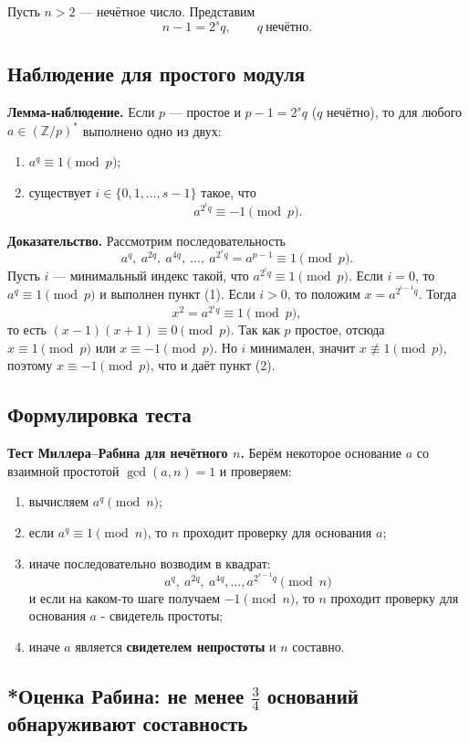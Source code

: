 \documentclass[12pt,a4paper]{article}
\newcommand{\Z}{\mathbb{Z}}
\DeclareMathOperator{\gcdop}{gcd}
\begin{document}
Пусть $n>2$ — нечётное число. Представим
\[
n-1=2^{s}q,\qquad q\ \text{нечётно}.
\]

\subsection*{Наблюдение для простого модуля}

\textbf{Лемма-наблюдение.}
Если $p$ — простое и $p-1=2^s q$ ($q$ нечётно), то для любого $a\in(\Z/p)^{\ast}$ выполнено одно из двух:
\begin{enumerate}
  \item $a^q\equiv 1\pmod p$;
  \item существует $i\in\{0,1,\dots,s-1\}$ такое, что
  \[
  a^{2^{i}q}\equiv -1\pmod p.
  \]
\end{enumerate}

\textbf{Доказательство.}
Рассмотрим последовательность
\[
a^{q},\ a^{2q},\ a^{4q},\ \dots,\ a^{2^{s}q}=a^{p-1}\equiv 1\pmod p.
\]
Пусть $i$ — минимальный индекс такой, что $a^{2^{i}q}\equiv 1\pmod p$.
Если $i=0$, то $a^{q}\equiv 1\pmod p$ и выполнен пункт (1).
Если $i>0$, то положим $x=a^{2^{i-1}q}$. Тогда
\[
x^2=a^{2^{i}q}\equiv 1\pmod p,
\]
то есть $(x-1)(x+1)\equiv 0\pmod p$.
Так как $p$ простое, отсюда $x\equiv 1\pmod p$ или $x\equiv -1\pmod p$.
Но $i$ минимален, значит $x\not\equiv 1\pmod p$, поэтому $x\equiv -1\pmod p$, что и даёт пункт (2).

\subsection*{Формулировка теста}

\textbf{Тест Миллера--Рабина для нечётного $n$.}
Берём некоторое основание $a$ со взаимной простотой $\gcdop(a,n)=1$ и проверяем:
\begin{enumerate}
  \item вычисляем $a^{q}\pmod n$;
  \item если $a^{q}\equiv 1\pmod n$, то $n$ проходит проверку для основания $a$;
  \item иначе последовательно возводим в квадрат:
  \[
  a^{q},\ a^{2q},\ a^{4q},\dots,a^{2^{s-1}q}\pmod n
  \]
  и если на каком-то шаге получаем $-1\pmod n$, то $n$ проходит проверку для основания $a$ - свидетель простоты;
  \item иначе $a$ является \textbf{свидетелем непростоты} и $n$ составно.
\end{enumerate}

\subsection{*Оценка Рабина: не менее $\tfrac34$ оснований обнаруживают составность}
\end{document}
